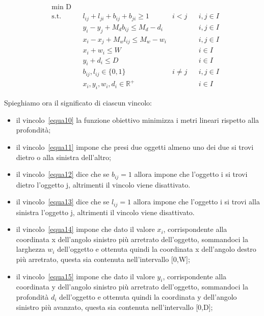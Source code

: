 \begin{align}
	& \underset{}{\text{min D}} \label{equa10}\\
	  & \text{s.t.} &   & l_{ij} + l_{ji} + b_{ij} + b_{ji} \geq 1      & i < j    &   & i,j \in I \label{equa11} \\
	  &             &   & y_i - y_j + M_d b_{ij} \leq M_d - d_i         &          &   & i,j \in I \label{equa12} \\
	  &             &   & x_i - x_j + M_w l_{ij} \leq M_w - w_i         &          &   & i,j \in I \label{equa13} \\
	  &             &   & x_i + w_i \leq W                              &          &   & i \in I   \label{equa14} \\
	  &             &   & y_i + d_i \leq D                              &          &   & i \in I   \label{equa15} \\
	  &             &   & b_{ij}, l_{ij} \in \{0,1\}                    & i \neq j &   & i,j \in I \label{equa16} \\
	  &             &   & x_{i}, y_{i}, w_{i}, d_{i} \in \mathbb{R}^{+} &          &   & i \in I  \label{equa17}  
\end{align}

Spieghiamo ora il significato di ciascun vincolo:
\begin{itemize}
	\item il vincolo~\eqref{equa10} la funzione obiettivo minimizza i metri lineari rispetto alla profondità;
	\item il vincolo~\eqref{equa11} impone che presi due oggetti almeno uno dei due si trovi dietro o alla sinistra dell'altro;
	\item il vincolo~\eqref{equa12} dice che se $b_{ij} = 1$ allora impone che l'oggetto i si trovi dietro l'oggetto j, altrimenti il vincolo viene disattivato. 
	\item il vincolo~\eqref{equa13} dice che se $l_{ij} = 1$ allora impone che l'oggetto i si trovi alla sinistra l'oggetto j, altrimenti il vincolo viene disattivato. 
	\item il vincolo~\eqref{equa14} impone che dato il valore $x_i$, corrispondente alla coordinata x dell'angolo sinistro più arretrato dell'oggetto, sommandoci la larghezza $w_i$ dell'oggetto e ottenuta quindi la coordinata x dell'angolo destro più arretrato, questa sia contenuta nell'intervallo [0,W];
	\item il vincolo~\eqref{equa15} impone che dato il valore $y_i$, corrispondente alla coordinata y dell'angolo sinistro più arretrato dell'oggetto, sommandoci la profondità $d_i$ dell'oggetto e ottenuta quindi la coordinata y dell'angolo sinistro più avanzato, questa sia contenuta nell'intervallo [0,D];
\end{itemize}

